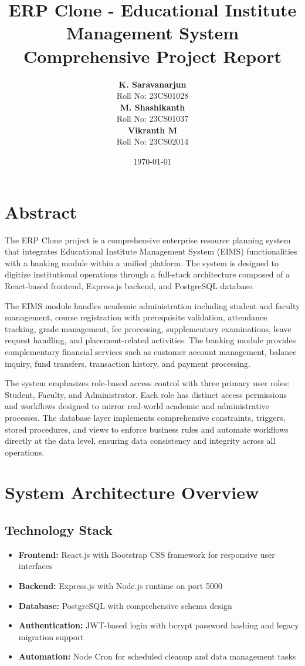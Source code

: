 \documentclass[12pt]{article}
\title{\textbf{ERP Clone - Educational Institute Management System \\ Comprehensive Project Report}}
\author{
\begin{tabular}{c}
\textbf{K. Saravanarjun} \\ Roll No: 23CS01028 \\[0.5em]
\textbf{M. Shashikanth} \\ Roll No: 23CS01037 \\[0.5em]
\textbf{Vikranth M} \\ Roll No: 23CS02014
\end{tabular}
}
\date{\today}
\begin{document}
\maketitle
\onehalfspacing

\tableofcontents
\newpage

\section*{Abstract}

The ERP Clone project is a comprehensive enterprise resource planning system that integrates Educational Institute Management System (EIMS) functionalities with a banking module within a unified platform. The system is designed to digitize institutional operations through a full-stack architecture composed of a React-based frontend, Express.js backend, and PostgreSQL database.

The EIMS module handles academic administration including student and faculty management, course registration with prerequisite validation, attendance tracking, grade management, fee processing, supplementary examinations, leave request handling, and placement-related activities. The banking module provides complementary financial services such as customer account management, balance inquiry, fund transfers, transaction history, and payment processing.

The system emphasizes role-based access control with three primary user roles: Student, Faculty, and Administrator. Each role has distinct access permissions and workflows designed to mirror real-world academic and administrative processes. The database layer implements comprehensive constraints, triggers, stored procedures, and views to enforce business rules and automate workflows directly at the data level, ensuring data consistency and integrity across all operations.

\newpage

\section{System Architecture Overview}

\subsection{Technology Stack}

\begin{itemize}
    \item \textbf{Frontend:} React.js with Bootstrap CSS framework for responsive user interfaces
    \item \textbf{Backend:} Express.js with Node.js runtime on port 5000
    \item \textbf{Database:} PostgreSQL with comprehensive schema design
    \item \textbf{Authentication:} JWT-based login with bcrypt password hashing and legacy migration support
    \item \textbf{Automation:} Node Cron for scheduled cleanup and data management tasks
\end{itemize}
\end{document}
